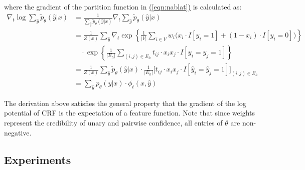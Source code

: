 \documentclass[11pt,a4paper]{article}
\begin{document}
where the gradient of the partition function in \hyperref[eqn:nablat]{(\ref{eqn:nablat})} is calculated as:
\begin{align}
\nabla_t\log\sum_{\hat{y}}\tilde{p}_\theta(\hat{y}|x)&=\frac{1}{\sum_{\hat{y}}\tilde{p}_\theta(\hat{y}|x)}\nabla_t\sum_{\hat{y}}\tilde{p}_\theta(\hat{y}|x)\nonumber\\
&=\frac{1}{Z(x)}\sum_{\hat{y}}\nabla_t\exp\left\{\frac{1}{|V|}\sum_{i\in V}w_i\big(x_i\cdot I[y_i=1]+(1-x_i)\cdot I[y_i=0]\big)\right\}\nonumber\\
&\quad\cdot\exp\left\{\frac{1}{|E_h|}\sum_{(i,j)\in E_h}t_{ij}\cdot x_ix_j\cdot I[y_i=y_j=1]\right\}\nonumber\\
&=\frac{1}{Z(x)}\sum_{\hat{y}}\tilde{p}_\theta(\hat{y}|x)\cdot\frac{1}{|E_h|}\Big[t_{ij}\cdot x_ix_j\cdot I[\hat{y}_i=\hat{y}_j=1]\Big]_{(i,j)\in E_h}\nonumber\\
&=\sum_{\hat{y}}p_\theta(\hat{y}|x)\cdot\phi_t(x,\hat{y})
\end{align}

The derivation above satisfies the general property that the gradient of the log potential of CRF is the expectation of a feature function. Note that since weights represent the credibility of unary and pairwise confidence, all entries of $\theta$ are non-negative.

\subsection{Experiments}
\label{sec:exp2}
\end{document}
